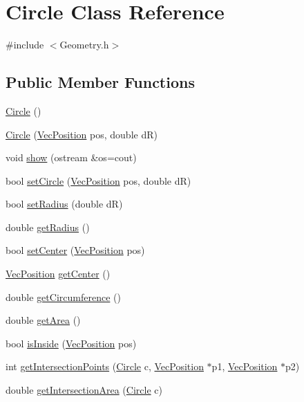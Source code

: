 \hypertarget{classCircle}{}\section{Circle Class Reference}
\label{classCircle}


{\ttfamily \#include $<$Geometry.\+h$>$}

\subsection*{Public Member Functions}
\begin{DoxyCompactItemize}
\item 
\hyperlink{classCircle_ad1ecfcfc7bf34529c6a6d6c448bf70fe}{Circle} ()
\item 
\hyperlink{classCircle_ad7f9593bf851318a1ae21d9f29a5dea2}{Circle} (\hyperlink{classVecPosition}{Vec\+Position} pos, double dR)
\item 
void \hyperlink{classCircle_a99ee3a377b63e791c0ec11dc7d19f8c8}{show} (ostream \&os=cout)
\item 
bool \hyperlink{classCircle_ab5907a7a059d3dcdc7552df34d088c0d}{set\+Circle} (\hyperlink{classVecPosition}{Vec\+Position} pos, double dR)
\item 
bool \hyperlink{classCircle_ac051b605aeb8f7d9e622cd92c55b4957}{set\+Radius} (double dR)
\item 
double \hyperlink{classCircle_af9fccec77d3a15d63594666dc8501437}{get\+Radius} ()
\item 
bool \hyperlink{classCircle_a2a0971c933027e36bc00bdeeb31908c8}{set\+Center} (\hyperlink{classVecPosition}{Vec\+Position} pos)
\item 
\hyperlink{classVecPosition}{Vec\+Position} \hyperlink{classCircle_af7d127e720ce202ca201c86696f3583f}{get\+Center} ()
\item 
double \hyperlink{classCircle_af7caaac585802144adf70ae30ed2bf1c}{get\+Circumference} ()
\item 
double \hyperlink{classCircle_a99fe1cbabbf3a9ccae51832376c5e8d4}{get\+Area} ()
\item 
bool \hyperlink{classCircle_ad6ff31cec463166dfc029f657a5eca99}{is\+Inside} (\hyperlink{classVecPosition}{Vec\+Position} pos)
\item 
int \hyperlink{classCircle_ad9f618a6a405ac5e01ace40b76e23034}{get\+Intersection\+Points} (\hyperlink{classCircle}{Circle} c, \hyperlink{classVecPosition}{Vec\+Position} $\ast$p1, \hyperlink{classVecPosition}{Vec\+Position} $\ast$p2)
\item 
double \hyperlink{classCircle_a4d44dc5ea2006a5ffff9b975b575147b}{get\+Intersection\+Area} (\hyperlink{classCircle}{Circle} c)
\end{DoxyCompactItemize}


